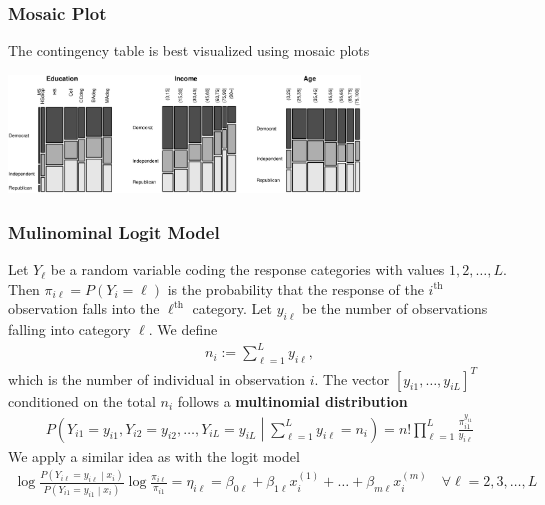 \subsubsection{Mosaic Plot}
The contingency table is best visualized using mosaic plots

\includegraphics[width=0.7\textwidth]{sections/GLM/images/mosaic}

\subsubsection{Mulinominal Logit Model}
Let $Y_\ell$ be a random variable coding the response categories with values
$1,2,\ldots,L$.
Then $\pi_{i\ell} = P(Y_i = \ell)$ is the probability that the response of the
$i^\text{th}$ observation falls into the $\ell^\text{th}$ category.
Let $y_{i\ell}$ be the number of observations falling into category $\ell$.
We define
\begin{align*}
n_i
:=
\sum_{\ell=1}^L y_{i\ell},
\end{align*}
which is the number of individual in observation $i$.
The vector $[y_{i1},\ldots,y_{iL}]^T$ conditioned on the total $n_i$ follows a
\textbf{multinomial distribution}
\begin{align*}
P\left(
Y_{i1} = y_{i1}, Y_{i2} = y_{i2}, \ldots, Y_{iL} = y_{iL}
\middle\vert
\sum_{\ell=1}^L y_{i\ell} = n_i
\right)
=
n!\prod_{\ell=1}^L \frac{\pi_{i1}^{y_{i1}}}{y_{i\ell}}
\end{align*}
We apply a similar idea as with the logit model
\begin{align*}
\log\frac{P\left(Y_{i\ell} = y_{i\ell} \middle\vert x_i\right)}
{P\left(Y_{i1} = y_{i1} \middle\vert x_i\right)}
\log \frac{\pi_{i\ell}}{\pi_{i1}}
=
\eta_{i\ell}
=
\beta_{0\ell} + \beta_{1\ell} x_i^{(1)} + \ldots + \beta_{m\ell} x_i^{(m)}
\quad
\forall \ell = 2,3,\ldots,L
\end{align*}

